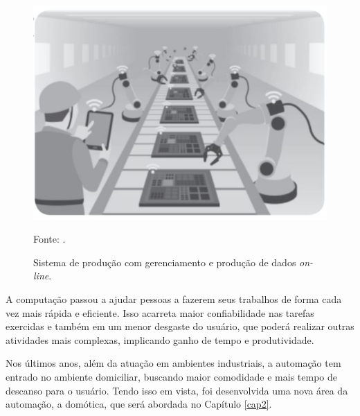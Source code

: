 \documentclass[
12pt,
openany, %
oneside, %
a4paper,			
english,			
brazil			        %
]{abntbibufjf}
\newcommand{\exu}[1]{\textcolor{red}{#1}}
\begin{document}
	
	\begin{figure}[!htb]
		\centering
		\includegraphics[scale=0.7]{Figuras/IoT.JPG}
		\caption{Sistema de produção com gerenciamento e produção de dados \textit{on-line}.}
		\label{VolatilidadePLD}
		\par Fonte: \cite{ALMEIDA}.
	\end{figure}
	
	
	A computação passou a ajudar pessoas a fazerem seus trabalhos de forma cada vez mais rápida e eficiente. Isso acarreta maior confiabilidade nas tarefas exercidas e também em um menor desgaste do usuário, que poderá realizar outras atividades mais complexas, implicando ganho de tempo e produtividade. 
	
	Nos últimos anos, além da atuação em ambientes industriais, a automação tem entrado no ambiente domiciliar, buscando maior comodidade e mais tempo de descanso para o usuário. Tendo isso em vista, foi desenvolvida uma nova área da automação, a domótica, que será abordada no Capítulo \ref{cap2}.
	
	
	
	
\end{document}
